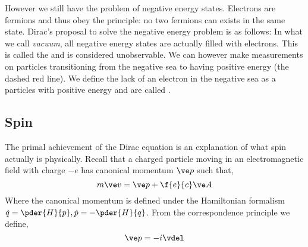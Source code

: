 \documentclass{article}
\begin{document}
However we still have the problem of negative energy states. Electrons are fermions and thus obey the  principle: no two fermions can exists in the same state. Dirac's proposal to solve the negative energy problem is as follows: In what we call \textit{vacuum}, all negative energy states are actually filled with electrons. This is called the  and is considered unobservable. We can however make measurements on particles transitioning from the negative sea to having positive energy (the dashed red line). We define the lack of an electron in the negative sea as a particles with positive energy and are called .

\subsection{Spin}

The primal achievement of the Dirac equation is an explanation of what spin actually is physically. Recall that a charged particle moving in an electromagnetic field with charge $- e$ has canonical momentum $\ve p$ such that,
\[ m \ve v = \ve p + \f{e}{c} \ve A \]
Where the canonical momentum is defined under the Hamiltonian formalism $\dot q = \pder{H}{p}, \dot p = - \pder{H}{q}$. From the correspondence principle we define,
\[ \ve p = - i \vdel \]
\end{document}
